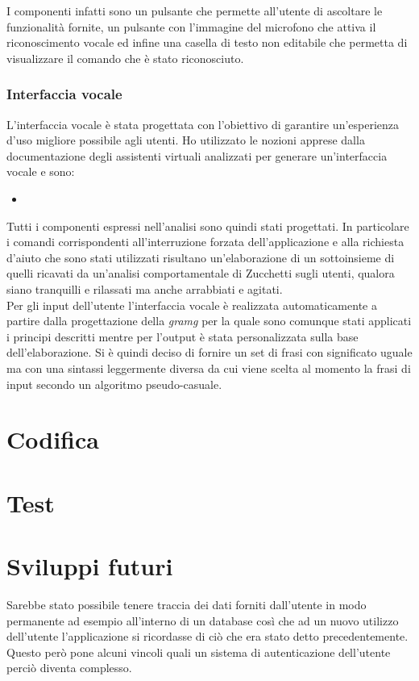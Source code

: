 		I componenti infatti sono un pulsante che permette all'utente di ascoltare le funzionalità fornite, un pulsante con l'immagine del microfono che attiva il riconoscimento vocale ed infine una casella di testo non editabile che permetta di visualizzare il comando che è stato riconosciuto.		
		\subsubsection{Interfaccia vocale}
		L'interfaccia vocale è stata progettata con l'obiettivo di garantire un'esperienza d'uso migliore possibile agli utenti. Ho utilizzato le nozioni apprese dalla documentazione degli assistenti virtuali analizzati per generare un'interfaccia vocale e sono:
		\begin{itemize}
			\item %
		\end{itemize}		
		Tutti i componenti espressi nell'analisi sono quindi stati progettati. In particolare i comandi corrispondenti all'interruzione forzata dell'applicazione e alla richiesta d'aiuto che sono stati utilizzati risultano un'elaborazione di un sottoinsieme di quelli ricavati da un'analisi comportamentale di Zucchetti sugli utenti, qualora siano tranquilli e rilassati ma anche arrabbiati e agitati. \\
		Per gli input dell'utente l'interfaccia vocale è realizzata automaticamente a partire dalla progettazione della \emph{\gls{gramg}} per la quale sono comunque stati applicati i principi descritti mentre per l'output è stata personalizzata sulla base dell'elaborazione. Si è quindi deciso di fornire un set di frasi con significato uguale ma con una sintassi leggermente diversa da cui viene scelta al momento la frasi di input secondo un algoritmo pseudo-casuale.
\section{Codifica}

\section{Test}

\section{Sviluppi futuri}
Sarebbe stato possibile tenere traccia dei dati forniti dall'utente in modo permanente ad esempio all'interno di un database così che ad un nuovo utilizzo dell'utente l'applicazione si ricordasse di ciò che era stato detto precedentemente. Questo però pone alcuni vincoli quali un sistema di autenticazione dell'utente perciò diventa complesso.